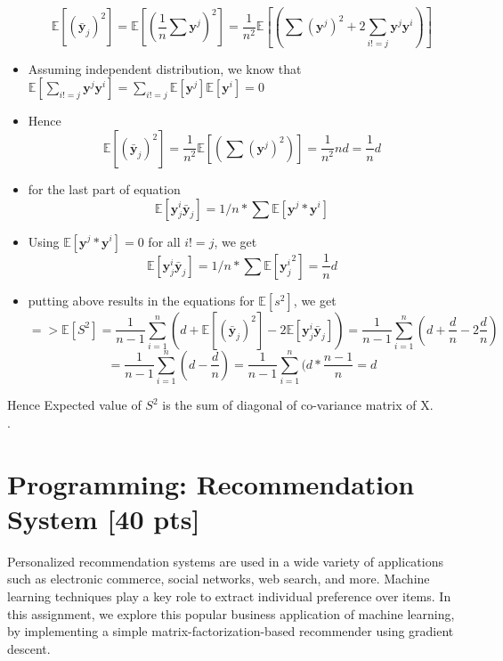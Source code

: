 \documentclass[twoside,10pt]{article}
\begin{document}
\begin{itemize}
     $$\mathbb{E}[(\bar{\textbf{y}}_j )^2] = \mathbb{E}[(\frac{1}{n} \sum \textbf{y}^j)^2] = \frac{1}{n^2}\mathbb{E}[( \sum (\textbf{y}^j)^2 + 2 \sum_{i!=j} {\textbf{y}^j \textbf{y}^i})]$$
     \item Assuming independent distribution, we know that $\mathbb{E}[\sum_{i!=j} {\textbf{y}^j \textbf{y}^i}] = \sum_{i!=j}\mathbb{E}[ \textbf{y}^j]\mathbb{E}[ \textbf{y}^i] = 0$
     \item Hence 
     $$\mathbb{E}[(\bar{\textbf{y}}_j )^2] = \frac{1}{n^2}\mathbb{E}[( \sum (\textbf{y}^j)^2 )] =\frac{1}{n^2} n d = \frac{1}{n}  d $$
     \item for the last part of equation
     $$ \mathbb{E}[\textbf{y}_j^i \bar{\textbf{y}}_j ] = 1/n* \sum \mathbb{E}[\textbf{y}^j * \textbf{y}^i]$$
     \item Using $\mathbb{E}[\textbf{y}^j * \textbf{y}^i] = 0$ for all $i!=j$, we get 
     $$ \mathbb{E}[\textbf{y}_j^i \bar{\textbf{y}}_j ] = 1/n* \sum \mathbb{E}[{\textbf{y}_j^i}^2] = \frac{1}{n}d$$
     \item putting above results in the equations for $\mathbb{E}[s^2]$, we get 
     $$=> \mathbb{E}[S^2] =\frac{1}{n-1} \sum_{i=1}^{n}(d + \mathbb{E}[(\bar{\textbf{y}}_j )^2] - 2 \mathbb{E}[\textbf{y}_j^i \bar{\textbf{y}}_j ])  = \frac{1}{n-1} \sum_{i=1}^{n}(d + \frac{d}{n} - 2 \frac{d}{n}) $$
     $$ = \frac{1}{n-1} \sum_{i=1}^{n}(d -  \frac{d}{n}) = \frac{1}{n-1} \sum_{i=1}^{n}(d * \frac{n-1}{n} = d $$
     
\end{itemize}

Hence Expected value of $S^2$ is the sum of diagonal of co-variance matrix of X.\\ .
\newpage
\section{Programming: Recommendation System [40 pts]}

Personalized recommendation systems are used in a wide variety of
applications such as electronic commerce, social networks, web
search, and more. Machine learning techniques play a key role to
extract individual preference over items. In this assignment, we
explore this popular business application of machine learning, by
implementing a simple matrix-factorization-based recommender using
gradient descent.
\end{document}
